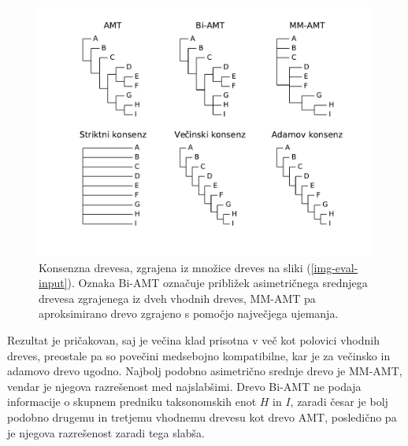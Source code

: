 \documentclass[a4paper, 12pt]{book}
\begin{document}
\begin{figure}[h!]
	\begin{center}
		\includegraphics[scale=0.55, clip=true, trim=1.5cm 1.5cm 1cm 0.8cm]{gfx/eval_gfx.pdf}
	\end{center}
	\caption{Konsenzna drevesa, zgrajena iz množice dreves na sliki (\ref{img-eval-input}). Oznaka Bi-AMT označuje približek asimetričnega srednjega drevesa zgrajenega iz dveh vhodnih dreves, MM-AMT pa aproksimirano drevo zgrajeno s pomočjo največjega ujemanja.}
	\label{img-eval-result}
\end{figure}

Rezultat je pričakovan, saj je večina klad prisotna v več kot polovici vhodnih dreves, preostale pa so povečini medsebojno kompatibilne, kar je za večinsko in adamovo drevo ugodno. Najbolj podobno asimetrično srednje drevo je MM-AMT, vendar je njegova razrešenost med najslabšimi. Drevo Bi-AMT ne podaja informacije o skupnem predniku taksonomskih enot $H$ in $I$, zaradi česar je bolj podobno drugemu in tretjemu vhodnemu drevesu kot drevo AMT, posledično pa je njegova razrešenost zaradi tega slabša. 
\end{document}
